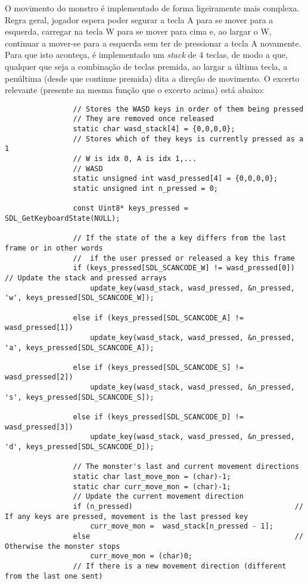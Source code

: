 \documentclass[a4paper]{report}
\begin{document}
            \par O movimento do monstro é implementado de forma ligeiramente mais complexa. Regra geral, jogador espera poder segurar a tecla A para se mover para a esquerda, carregar na tecla W para se mover para cima e, ao largar o W, continuar a mover-se para a esquerda sem ter de pressionar a tecla A novamente. Para que isto aconteça, é implementado um \textit{stack} de 4 teclas, de modo a que, qualquer que seja a combinação de teclas premida, ao largar a última tecla, a penúltima (desde que continue premida) dita a direção de movimento. O excerto relevante (presente na mesma função que o excerto acima) está abaixo:
            \begin{lstlisting}
                // Stores the WASD keys in order of them being pressed
                // They are removed once released
                static char wasd_stack[4] = {0,0,0,0};
                // Stores which of they keys is currently pressed as a 1
                // W is idx 0, A is idx 1,...
                // WASD
                static unsigned int wasd_pressed[4] = {0,0,0,0};
                static unsigned int n_pressed = 0;
            
                const Uint8* keys_pressed = SDL_GetKeyboardState(NULL);
            
                // If the state of the a key differs from the last frame or in other words
                //  if the user pressed or released a key this frame
                if (keys_pressed[SDL_SCANCODE_W] != wasd_pressed[0])    // Update the stack and pressed arrays
                    update_key(wasd_stack, wasd_pressed, &n_pressed, 'w', keys_pressed[SDL_SCANCODE_W]);
            
                else if (keys_pressed[SDL_SCANCODE_A] != wasd_pressed[1])
                    update_key(wasd_stack, wasd_pressed, &n_pressed, 'a', keys_pressed[SDL_SCANCODE_A]);
            
                else if (keys_pressed[SDL_SCANCODE_S] != wasd_pressed[2])
                    update_key(wasd_stack, wasd_pressed, &n_pressed, 's', keys_pressed[SDL_SCANCODE_S]);
            
                else if (keys_pressed[SDL_SCANCODE_D] != wasd_pressed[3])
                    update_key(wasd_stack, wasd_pressed, &n_pressed, 'd', keys_pressed[SDL_SCANCODE_D]);
            
                // The monster's last and current movement directions
                static char last_move_mon = (char)-1;
                static char curr_move_mon = (char)-1;
                // Update the current movement direction
                if (n_pressed)                                      // If any keys are pressed, movement is the last pressed key
                    curr_move_mon =  wasd_stack[n_pressed - 1];
                else                                                // Otherwise the monster stops
                    curr_move_mon = (char)0;
                // If there is a new movement direction (different from the last one sent)
            
            \end{lstlisting}
\end{document}

